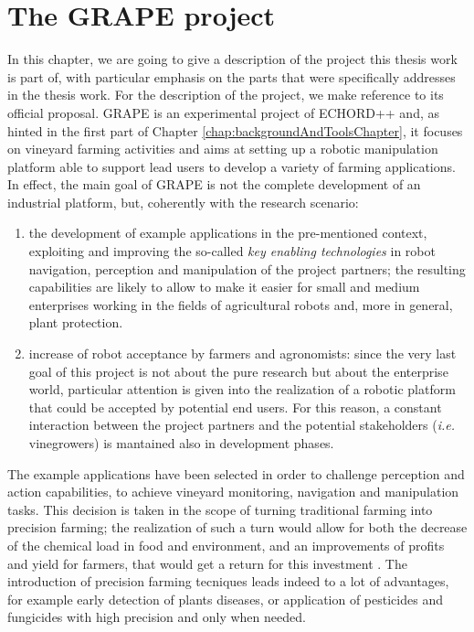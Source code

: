
\chapter{The GRAPE project} \label{chap:grapeProject}

In this chapter, we are going to give a description of the project this thesis work is part of, with particular emphasis on the parts that were specifically addresses in the thesis work. For the description of the project, we make reference to its official proposal.
\ac{GRAPE} is an experimental project of \ac{ECHORD++} and, as hinted in the first part of Chapter \ref{chap:backgroundAndToolsChapter}, it focuses on vineyard farming activities and aims at setting up a robotic manipulation platform able to support lead users to develop a variety of farming applications.
 In effect, the main goal of \ac{GRAPE} is not the complete development of an industrial platform, but, coherently with the research scenario:
\begin{enumerate}
	\item the development of example applications in the pre-mentioned context, exploiting and improving the so-called \textit{key enabling technologies} in robot navigation, perception and manipulation of the project partners; the resulting capabilities are likely to allow to make it easier for small and medium enterprises working in the fields of agricultural robots and, more in general, plant protection.
	\item increase of robot acceptance by farmers and agronomists: since the very last goal of this project is not about the pure research but about the enterprise world, particular attention is given into the realization of a robotic platform that could be accepted by potential end users. For this reason, a constant interaction between the project partners and the potential stakeholders (\textit{i.e.} vinegrowers) is mantained also in development phases.
\end{enumerate}

The example applications have been selected in order to challenge perception and action capabilities, to achieve vineyard monitoring, navigation and manipulation tasks. This decision is taken in the scope of turning traditional farming into precision farming; the realization of such a turn would allow for both the decrease of the chemical load in food and environment, and an improvements of profits and yield for farmers, that would get a return for this investment \parencite{precisionFarming}. The introduction of precision farming tecniques leads indeed to a lot of advantages, for example early detection of plants diseases, or application of pesticides and fungicides with high precision and only when needed.

